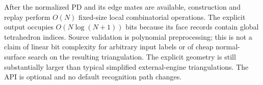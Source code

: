 After the normalized PD and its edge mates are available, construction and
replay perform $O(N)$ fixed-size local combinatorial operations. The explicit
output occupies $O(N\log(N+1))$ bits because its face records contain global
tetrahedron indices. Source validation is polynomial preprocessing; this is
not a claim of linear bit complexity for arbitrary input labels or of cheap
normal-surface search on the resulting triangulation. The explicit geometry
is still substantially larger than typical simplified external-engine
triangulations. The API is optional and no default recognition path changes.


